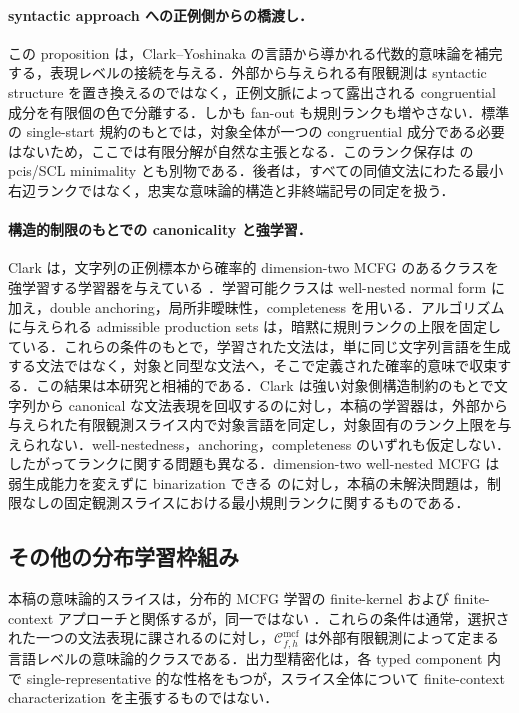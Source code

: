 \documentclass[11pt,a4paper]{ltjsarticle}
\numberwithin{equation}{section}
\theoremstyle{plain}
\theoremstyle{definition}
\theoremstyle{remark}
\newcommand{\Cmcf}[2]{\mathcal{C}^{\mathrm{mcf}}_{#1,#2}}
\begin{document}
\paragraph{syntactic approach への正例側からの橋渡し．}
この proposition は，Clark--Yoshinaka の言語から導かれる代数的意味論を補完する，表現レベルの接続を与える．外部から与えられる有限観測は syntactic structure を置き換えるのではなく，正例文脈によって露出される congruential 成分を有限個の色で分離する．しかも fan-out も規則ランクも増やさない．標準の single-start 規約のもとでは，対象全体が一つの congruential 成分である必要はないため，ここでは有限分解が自然な主張となる．このランク保存は \cite{ClarkYoshinaka2014Algebraic} の pcis/SCL minimality とも別物である．後者は，すべての同値文法にわたる最小右辺ランクではなく，忠実な意味論的構造と非終端記号の同定を扱う．

\paragraph{構造的制限のもとでの canonicality と強学習．}
Clark は，文字列の正例標本から確率的 dimension-two MCFG のあるクラスを強学習する学習器を与えている \cite{Clark2021Strong}．学習可能クラスは well-nested normal form に加え，double anchoring，局所非曖昧性，completeness を用いる．アルゴリズムに与えられる admissible production sets は，暗黙に規則ランクの上限を固定している．これらの条件のもとで，学習された文法は，単に同じ文字列言語を生成する文法ではなく，対象と同型な文法へ，そこで定義された確率的意味で収束する．この結果は本研究と相補的である．Clark は強い対象側構造制約のもとで文字列から canonical な文法表現を回収するのに対し，本稿の学習器は，外部から与えられた有限観測スライス内で対象言語を同定し，対象固有のランク上限を与えられない．well-nestedness，anchoring，completeness のいずれも仮定しない．したがってランクに関する問題も異なる．dimension-two well-nested MCFG は弱生成能力を変えずに binarization できる \cite{Clark2021Strong} のに対し，本稿の未解決問題は，制限なしの固定観測スライスにおける最小規則ランクに関するものである．

\subsection{その他の分布学習枠組み}

本稿の意味論的スライスは，分布的 MCFG 学習の finite-kernel および finite-context アプローチと関係するが，同一ではない
\cite{Yoshinaka2010,ClarkYoshinaka2014,ClarkYoshinaka2016,KanazawaYoshinaka2017}．これらの条件は通常，選択された一つの文法表現に課されるのに対し，$\Cmcf{f}{h}$ は外部有限観測によって定まる言語レベルの意味論的クラスである．出力型精密化は，各 typed component 内で single-representative 的な性格をもつが，スライス全体について finite-context characterization を主張するものではない．
\end{document}
